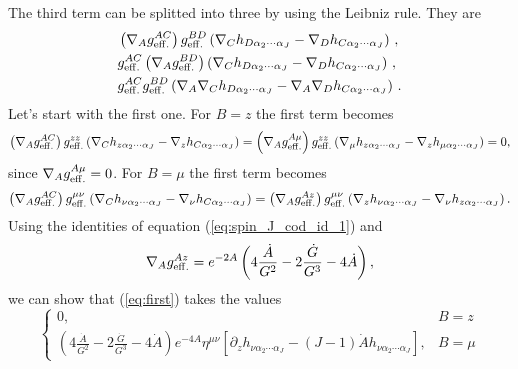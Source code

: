 \documentclass[a4paper,12pt]{article}
\begin{document}
The third term can be splitted into three by using the Leibniz rule. They are
\begin{align}
&\left(\nabla_A g^{AC}_{\rm{eff.}}\right) g^{BD}_{\rm {eff.}} \left(\nabla_C h_{D \alpha_2 \cdots \alpha_J} - \nabla_D h_{C \alpha_2 \cdots \alpha_J}\right)  \label{eq:first} \, , \\
&g^{AC}_{\rm{eff.}}\left(\nabla_A g^{BD}_{\rm{eff.}}\right) \left(\nabla_C h_{D \alpha_2 \cdots \alpha_J} - \nabla_D h_{C \alpha_2 \cdots \alpha_J}\right)  \label{eq:second} \, , \\
& g^{AC}_{\rm{eff.}}g^{BD}_{\rm{eff.}} \left( \nabla_A \nabla_C h_{D \alpha_2 \cdots \alpha_J} - \nabla_A \nabla_D h_{C \alpha_2 \cdots \alpha_J}\right) \label{eq:last} \, . 
\end{align}
Let's start with the first one. For $B = z$ the first term becomes
\begin{equation}
\left(\nabla_A g^{AC}_{\rm{eff.}}\right) g^{zz}_{\rm {eff.}} \left(\nabla_C h_{z \alpha_2 \cdots \alpha_J} - \nabla_z h_{C \alpha_2 \cdots \alpha_J}\right) = \left(\nabla_A g^{A\mu}_{\rm{eff.}}\right) g^{zz}_{\rm {eff.}} \left(\nabla_\mu h_{z \alpha_2 \cdots \alpha_J} - \nabla_z h_{\mu \alpha_2 \cdots \alpha_J}\right) = 0,
\end{equation}
since $\nabla_A g^{A\mu}_{\rm{eff.}} = 0$.
For $B = \mu$ the first term becomes
\begin{equation}
\left(\nabla_A g^{AC}_{\rm{eff.}}\right) g^{\mu\nu}_{\rm {eff.}} \left(\nabla_C h_{\nu \alpha_2 \cdots \alpha_J} - \nabla_\nu h_{C \alpha_2 \cdots \alpha_J}\right) = \left(\nabla_A g^{Az}_{\rm{eff.}}\right) g^{\mu\nu}_{\rm {eff.}} \left(\nabla_z h_{\nu \alpha_2 \cdots \alpha_J} - \nabla_\nu h_{z \alpha_2 \cdots \alpha_J}\right).
\end{equation}
Using the identities of equation (\ref{eq:spin_J_cod_id_1}) and
\begin{align}
\nabla_A g^{Az}_{\rm{eff.}} = e^{-2A} \left( 4 \frac{\dot{A}}{G^2} - 2 \frac{\dot{G}}{G^3} - 4 \dot{A} \right),
\end{align}
we can show that (\ref{eq:first}) takes the values
\begin{equation}
\begin{cases}
0, & B = z \\
\left( 4 \frac{\dot{A}}{G^2} - 2 \frac{\dot{G}}{G^3} - 4 \dot{A} \right) e^{-4A} \eta^{\mu \nu} \left[ \partial_z h_{\nu \alpha_2 \cdots \alpha_J} - \left(J-1\right) \dot{A} h_{\nu \alpha_2 \cdots \alpha_J} \right],  &B = \mu
\end{cases}
\end{equation}
\end{document}

